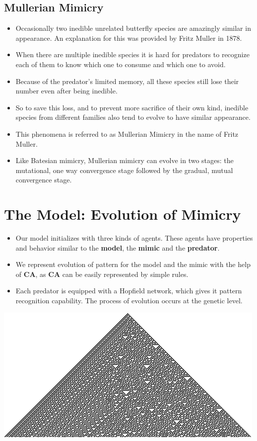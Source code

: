 \documentclass[a0,landscape]{a0poster}
\begin{document}
\begin{multicols}{5}
\color{DarkSlateGray}
\subsection*{Mullerian Mimicry}
\begin{itemize}
	\item Occasionally two inedible unrelated butterfly species are amazingly similar in appearance. An explanation for this was provided by Fritz Muller in 1878. 
	\item When there are multiple inedible species it is hard for predators to recognize each of them to know which one to consume and which one to avoid.
	\item Because of the predator's limited memory, all these species still lose their number even after being inedible. 
	\item So to save this loss, and to prevent more sacrifice of their own kind, inedible species from different families also tend to evolve to have similar appearance. 
	\item This phenomena is referred to as Mullerian Mimicry in the name of Fritz Muller. 
	\item Like Batesian mimicry, Mullerian mimicry can evolve in two stages: the mutational, one way convergence stage followed by the gradual, mutual convergence stage.
\end{itemize}

\color{SaddleBrown} 
\section*{The Model: Evolution of Mimicry}

\begin{itemize}
	\item Our model initializes with three kinds of agents. These agents have properties and behavior similar to the \textbf{model}, the \textbf{mimic} and the \textbf{predator}.
	\item We represent evolution of pattern for the model and the mimic with the help of \textbf{CA}, as \textbf{CA} can be easily represented by simple rules.
	\item Each predator is equipped with a Hopfield network, which gives it pattern recognition capability. The process of evolution occurs at the genetic level.
\end{itemize}

\begin{center}\vspace{1cm}
\includegraphics[width=0.50\linewidth]{CA_rule30s.png}
\label{fig:cellular-automata-rule-30}
\end{center}\vspace{1cm}


\end{multicols}
\end{document}
